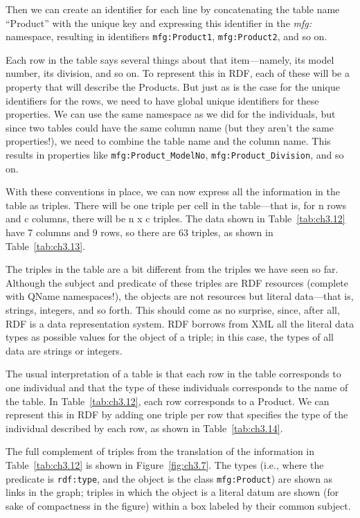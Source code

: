 \begin{challenge}
Then we can create an identifier for each line by concatenating the
table name ``Product'' with the unique key and expressing this
identifier in the \emph{mfg:} namespace, resulting in identifiers \texttt{mfg:Product1},
\texttt{mfg:Product2}, and so on.

Each row in the table says several things about that item---namely, its
model number, its division, and so on. To represent this in RDF, each of these will be a property that will
describe the Products. But just as is the case for the unique
identifiers for the rows, we need to have global unique identifiers for
these properties. We can use the same namespace as we did for the
individuals, but since two tables could have the same column name (but
they aren't the same properties!), we need to combine the table name and
the column name. This results in properties like \texttt{mfg:Product\_ModelNo},
\texttt{mfg:Product\_Division}, and so on.

With these conventions in place, we can now express all the information
in the table as triples. There will be one triple per cell in the
table---that is, for n rows and c columns, there will be n x c triples.
The data shown in Table~\ref{tab:ch3.12} have 7 columns and 9 rows, so there are 63
triples, as shown in Table~\ref{tab:ch3.13}.

The triples in the table are a bit different from the triples we have
seen so far. Although the subject and  
predicate of these triples are RDF resources (complete with QName
namespaces!), the objects are not resources but literal data---that is,
strings, integers, and so forth. This should come as no surprise, since,
after all, RDF is a data representation system. RDF borrows from XML all
the literal data types as possible values for the object of a triple; in
this case, the types of all data are strings or integers.

The usual interpretation of a table is that each row in the table
corresponds to one individual and that the type of these individuals
corresponds to the name of the table. In Table~\ref{tab:ch3.12}, each row
corresponds to a Product. We can represent this in RDF by adding one
triple per row that specifies the type of the individual described by
each row, as shown in Table~\ref{tab:ch3.14}.

The full complement of triples from the translation of the information
in Table~\ref{tab:ch3.12} is shown in Figure~\ref{fig:ch3.7}. The types (i.e., where the
predicate is \texttt{rdf:type}, and the object is the class \texttt{mfg:Product}) are
shown as links in the graph; triples in which the object is a literal
datum are shown (for sake of compactness in the figure) within a box
labeled by their common subject.


\end{challenge}
